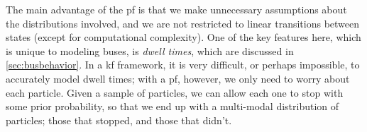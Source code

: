 \documentclass[12pt,a4paper]{article}
\newcommand{\bY}{\mathbf{Y}}
\newcommand{\bX}{\mathbf{X}}
\newcommand{\btheta}{\boldsymbol{\theta}}
\begin{document}
The main advantage of the \gls{pf} is that we make unnecessary assumptions about the distributions
involved, and we are not restricted to linear transitions between states (except for computational
complexity).
One of the key features here, which is unique to modeling buses, 
is \emph{dwell times}, which are discussed in \cref{sec:busbehavior}.
In a \gls{kf} framework, it is very difficult, or perhaps impossible, to accurately
model dwell times;
with a \gls{pf}, however, we only need to worry about each particle.
Given a sample of particles, we can allow each one to stop with some prior probability,
so that we end up with a multi-modal distribution of particles; those that stopped, 
and those that didn't.










\end{document}
